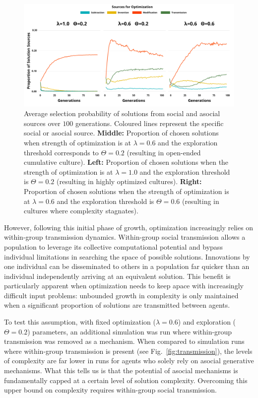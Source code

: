 \documentclass{article}
\begin{document}
\begin{figure}[H]
\begin{center}
    \includegraphics[width=\linewidth]{choices.png}
\end{center}
    \caption{Average selection probability of solutions from social and asocial sources over $100$ generations. Coloured lines represent the specific social or asocial source. \textbf{Middle:} Proportion of chosen solutions when strength of optimization is at $\lambda=0.6$ and the exploration threshold corresponds to $\Theta=0.2$ (resulting in open-ended cumulative culture). \textbf{Left:} Proportion of chosen solutions when the strength of optimization is at $\lambda=1.0$ and the exploration threshold is $\Theta=0.2$ (resulting in highly optimized cultures). \textbf{Right:} Proportion of chosen solutions when the strength of optimization is at $\lambda=0.6$ and the exploration threshold is $\Theta=0.6$ (resulting in cultures where complexity stagnates).}
    \label{fig:event}
\end{figure}

However, following this initial phase of growth, optimization increasingly relies on within-group transmission dynamics. Within-group social transmission allows a population to leverage its collective computational potential and bypass individual limitations in searching the space of possible solutions. Innovations by one individual can be disseminated to others in a population far quicker than an individual independently arriving at an equivalent solution. This benefit is particularly apparent when optimization needs to keep apace with increasingly difficult input problems: unbounded growth in complexity is only maintained when a significant proportion of solutions are transmitted between agents. 

To test this assumption, with fixed optimization ($\lambda=0.6$) and exploration ($\Theta=0.2$) parameters, an additional simulation was run where within-group transmission was removed as a mechanism. When compared to simulation runs where within-group transmission is present (see Fig.~\ref{fig:transmission}), the levels of complexity are far lower in runs for agents who solely rely on asocial generative mechanisms. What this tells us is that the potential of asocial mechanisms is fundamentally capped at a certain level of solution complexity. Overcoming this upper bound on complexity requires within-group social transmission.
\end{document}
